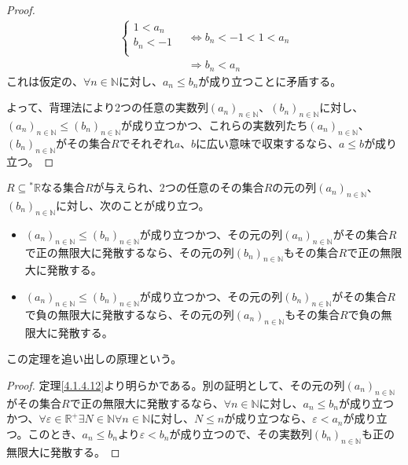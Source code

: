 \documentclass[dvipdfmx]{jsarticle}
\begin{document}
\begin{proof}
\begin{align*}
\left\{ \begin{matrix}
1 < a_{n} \\
b_{n} < - 1 \\
\end{matrix} \right.\  &\Leftrightarrow b_{n} < - 1 < 1 < a_{n}\\
&\Rightarrow b_{n} < a_{n}
\end{align*}
これは仮定の、$\forall n \in \mathbb{N}$に対し、$a_{n} \leq b_{n}$が成り立つことに矛盾する。\par
よって、背理法により2つの任意の実数列$\left( a_{n} \right)_{n \in \mathbb{N}}$、$\left( b_{n} \right)_{n \in \mathbb{N}}$に対し、$\left( a_{n} \right)_{n \in \mathbb{N}} \leq \left( b_{n} \right)_{n \in \mathbb{N}}$が成り立つかつ、これらの実数列たち$\left( a_{n} \right)_{n \in \mathbb{N}}$、$\left( b_{n} \right)_{n \in \mathbb{N}}$がその集合$R$でそれぞれ$a$、$b$に広い意味で収束するなら、$a \leq b$が成り立つ。
\end{proof}
\begin{thm}[追い出しの原理]\label{4.1.4.13}
$R \subseteq{}^{*}\mathbb{R}$なる集合$R$が与えられ、2つの任意のその集合$R$の元の列$\left( a_{n} \right)_{n \in \mathbb{N}}$、$\left( b_{n} \right)_{n \in \mathbb{N}}$に対し、次のことが成り立つ。
\begin{itemize}
\item
  $\left( a_{n} \right)_{n \in \mathbb{N}} \leq \left( b_{n} \right)_{n \in \mathbb{N}}$が成り立つかつ、その元の列$\left( a_{n} \right)_{n \in \mathbb{N}}$がその集合$R$で正の無限大に発散するなら、その元の列$\left( b_{n} \right)_{n \in \mathbb{N}}$もその集合$R$で正の無限大に発散する。
\item
  $\left( a_{n} \right)_{n \in \mathbb{N}} \leq \left( b_{n} \right)_{n \in \mathbb{N}}$が成り立つかつ、その元の列$\left( b_{n} \right)_{n \in \mathbb{N}}$がその集合$R$で負の無限大に発散するなら、その元の列$\left( a_{n} \right)_{n \in \mathbb{N}}$もその集合$R$で負の無限大に発散する。
\end{itemize}
この定理を追い出しの原理という。
\end{thm}
\begin{proof} 定理\ref{4.1.4.12}より明らかである。別の証明として、その元の列$\left( a_{n} \right)_{n \in \mathbb{N}}$がその集合$R$で正の無限大に発散するなら、$\forall n \in \mathbb{N}$に対し、$a_{n} \leq b_{n}$が成り立つかつ、$\forall\varepsilon \in \mathbb{R}^{+}\exists N \in \mathbb{N}\forall n \in \mathbb{N}$に対し、$N \leq n$が成り立つなら、$\varepsilon < a_{n}$が成り立つ。このとき、$a_{n} \leq b_{n}$より$\varepsilon < b_{n}$が成り立つので、その実数列$\left( b_{n} \right)_{n \in \mathbb{N}}$も正の無限大に発散する。
\end{proof}
\end{document}

